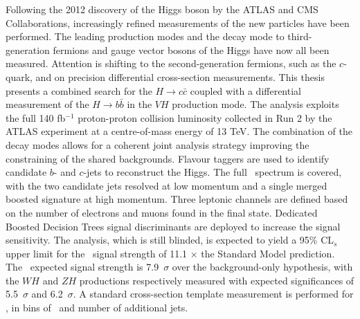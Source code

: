 Following the 2012 discovery of the Higgs boson by the ATLAS and CMS Collaborations, increasingly refined measurements of the new particles have been performed. The leading production modes and the decay mode to third-generation fermions and gauge vector bosons of the Higgs have now all been measured. Attention is shifting to the second-generation fermions, such as the $c$-quark, and on precision differential cross-section measurements. This thesis presents a combined search for the $H \rightarrow c\bar{c}$ coupled with a differential measurement of the $H \rightarrow b\bar{b}$ in the $VH$ production mode. The analysis exploits the full 140 fb$^{-1}$ proton-proton collision luminosity collected in Run 2 by the ATLAS experiment at a centre-of-mass energy of 13 TeV. The combination of the decay modes allows for a coherent joint analysis strategy improving the constraining of the shared backgrounds. Flavour taggers are used to identify candidate $b$- and $c$-jets to reconstruct the Higgs. The full \pt\ spectrum is covered, with the two candidate jets resolved at low momentum and a single merged boosted signature at high momentum. Three leptonic channels are defined based on the number of electrons and muons found in the final state. Dedicated Boosted Decision Trees signal discriminants are deployed to increase the signal sensitivity. The analysis, which is still blinded, is expected to yield a 95\% CL$_s$ upper limit for the \vhc\ signal strength of 11.1 $\times$ the Standard Model prediction. The \vhb\ expected signal strength is 7.9~$\sigma$ over the background-only hypothesis, with the $WH$ and $ZH$ productions respectively measured with expected significances of 5.5~$\sigma$ and 6.2~$\sigma$. A standard cross-section template measurement is performed for \vhb, in bins of \pt\ and number of additional jets.
\vspace*{\fill}
    
